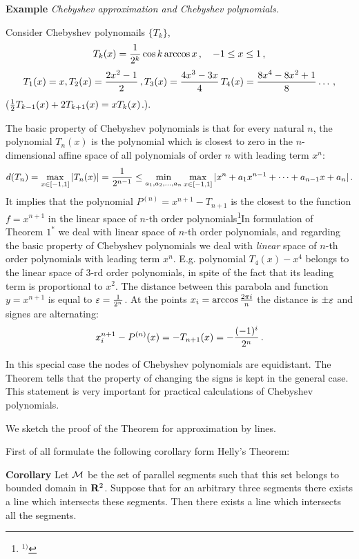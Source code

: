 {{\bf Example} {\it Chebyshev approximation and Chebyshev polynomials.}

   Consider Chebyshev polynomails $\{T_k\}$,
                      $$
T_k(x)={1\over 2^k}\cos k \arccos x\,,\quad -1\leq x\leq 1\,,
                      $$
                   $$
T_1(x)=x,
T_2(x)={2x^2-1\over 2}\,, T_3(x)={4x^3-3x\over 4}\,
  T_4(x)={8x^4-8x^2+1\over 8}\dots\,, 
                    $$
(${1\over 2}T_{k-1}(x)+2T_{k+1}(x)=xT_k(x)$.).

The basic property of Chebyshev polynomials is that for every natural
$n$, the polynomial
$T_n(x)$ is the polynomial which is 
closest to zero in the $n$-dimensional
 affine space of all polynomials
 of order $n$ with leading term $x^n$:
            $$
d(T_n)=\max_{x\in [-1,1]}|T_n(x)|={1\over 2^{n-1}}\leq
 \min_{a_1,a_2,\dots,a_n}\max_{x\in [-1,1]}
  |x^n+a_1x^{n-1}+\dots+a_{n-1}x+a_n|\,.
            $$
It implies that the 
polynomial $P^{(n)}=x^{n+1}-T_{n+1}$ is the closest
to the function $f=x^{n+1}$ in the linear space
of $n$-th order polynomials\footnote{$^{1)}$}{In formulation of Theorem
$1^*$ we deal with linear space of $n$-th order polynomials, and
regarding the basic property of Chebyshev polynomials we deal with
{\it linear} space of $n$-th order  polynomials with leading term $x^n$.
E.g. polynomial $T_4(x)-x^4$ belongs to the linear space of $3$-rd order
polynomials, in spite of the fact that its leading term is proportional to
$x^2$. }
The distance between this parabola and function $y=x^{n+1}$
is equal to ${\varepsilon}={1\over 2^n}$.
At the points $x_i=\arccos {2\pi i\over n}$
the distance is $\pm {\varepsilon}$ and signes are alternating:
         $$
  x_i^{n+1}-P^{(n)}(x)=-T_{n+1}(x)=-{(-1)^i\over 2^n}\,.
         $$

In this special case the nodes of Chebyshev polynomials
are equidistant. The Theorem tells that
the property of changing the signs is kept in the general case.
This statement is very important for practical 
calculations of Chebyshev polynomials.

               
We sketch the proof of the Theorem for approximation by lines.


First of all formulate the following corollary form Helly's Theorem:

  {\bf Corollary }
 Let $\cal M$ be the set of parallel segments such that
 this set  belongs to bounded domain in ${\bf R}^2$. 
Suppose that for an arbitrary three
segments there exists a line which intersects these segments.
Then there exists a line which intersects all the segments.

}
